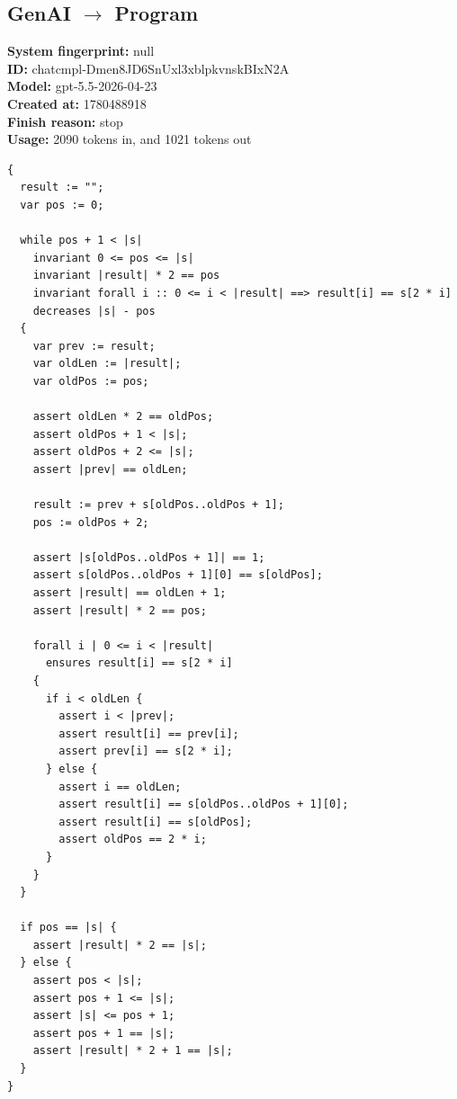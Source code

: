 \documentclass{article}
\begin{document}
\subsection*{GenAI $\rightarrow$ Program}
\textbf{System fingerprint: }null
\\\textbf{ID: }chatcmpl-Dmen8JD6SnUxl3xblpkvnskBIxN2A
\\\textbf{Model: }gpt-5.5-2026-04-23
\\\textbf{Created at: }1780488918
\\\textbf{Finish reason: }stop
\\\textbf{Usage: }2090 tokens in, and 1021 tokens out
\begin{lstlisting}
{
  result := "";
  var pos := 0;

  while pos + 1 < |s|
    invariant 0 <= pos <= |s|
    invariant |result| * 2 == pos
    invariant forall i :: 0 <= i < |result| ==> result[i] == s[2 * i]
    decreases |s| - pos
  {
    var prev := result;
    var oldLen := |result|;
    var oldPos := pos;

    assert oldLen * 2 == oldPos;
    assert oldPos + 1 < |s|;
    assert oldPos + 2 <= |s|;
    assert |prev| == oldLen;

    result := prev + s[oldPos..oldPos + 1];
    pos := oldPos + 2;

    assert |s[oldPos..oldPos + 1]| == 1;
    assert s[oldPos..oldPos + 1][0] == s[oldPos];
    assert |result| == oldLen + 1;
    assert |result| * 2 == pos;

    forall i | 0 <= i < |result|
      ensures result[i] == s[2 * i]
    {
      if i < oldLen {
        assert i < |prev|;
        assert result[i] == prev[i];
        assert prev[i] == s[2 * i];
      } else {
        assert i == oldLen;
        assert result[i] == s[oldPos..oldPos + 1][0];
        assert result[i] == s[oldPos];
        assert oldPos == 2 * i;
      }
    }
  }

  if pos == |s| {
    assert |result| * 2 == |s|;
  } else {
    assert pos < |s|;
    assert pos + 1 <= |s|;
    assert |s| <= pos + 1;
    assert pos + 1 == |s|;
    assert |result| * 2 + 1 == |s|;
  }
}
\end{lstlisting}
\end{document}
